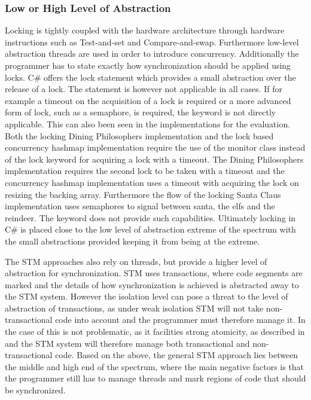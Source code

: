 \subsubsection{Low or High Level of Abstraction}\label{subsec:level_of_abstraction}
Locking is tightly coupled with the hardware architecture through hardware instructions such as Test-and-set and Compare-and-swap\cite[p. 1990]{scott2011sync}. Furthermore low-level abstraction threads are used in order to introduce concurrency. Additionally the programmer has to state exactly how synchronization should be applied using locks. C\# offers the lock  statement which provides a small abstraction over the release of a lock. The  statement is however not applicable in all cases. If for example a timeout on the acquisition of a lock is required or a more advanced form of lock, such as a semaphore, is required, the  keyword is not directly applicable. This can also been seen in the implementations for the evaluation. Both the locking Dining Philosophers implementation and the lock based concurrency hashmap implementation require the use of the monitor class instead of the lock keyword for acquiring a lock with a timeout. The Dining Philosophers implementation requires the second lock to be taken with a timeout and the concurrency hashmap implementation uses a timeout with acquiring the lock on resizing the backing array. Furthermore the flow of the locking Santa Claus implementation uses semaphores to signal between santa, the elfs and the reindeer. The  keyword does not provide such capabilities. Ultimately locking in C\# is placed close to the low level of abstraction extreme of the spectrum with the small abstractions provided keeping it from being at the extreme. 

The \ac{STM} approaches also rely on threads, but provide a higher level of abstraction for synchronization. \ac{STM} uses transactions, where code segments are marked and the details of how synchronization is achieved is abstracted away to the \ac{STM} system. However the isolation level can pose a threat to the level of abstraction of transactions, as under weak isolation \ac{STM} will not take non-transactional code into account and the programmer must therefore manage it. In the case of \stmnamesp this is not problematic, as it facilities strong atomicity, as described in  and the \ac{STM} system will therefore manage both transactional and non-transactional code. Based on the above, the general \ac{STM} approach lies between the middle and high end of the spectrum, where the main negative factors is that the programmer still has to manage threads and mark regions of code that should be synchronized.

